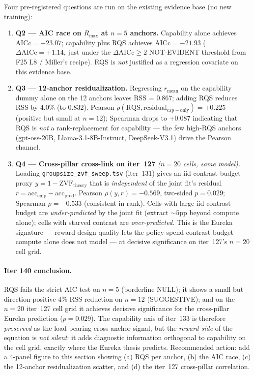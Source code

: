 \documentclass{article}
\begin{document}
Four pre-registered questions are run on the existing evidence base
(no new training):
\begin{enumerate}
  \item \textbf{Q2 --- AIC race on $R_{\max}$ at $n=5$ anchors.}
    Capability alone achieves
    $\mathrm{AICc} = -23.07$; capability plus RQS achieves
    $\mathrm{AICc} = -21.93$ ($\Delta \mathrm{AICc} = +1.14$,
    just under the $\Delta \mathrm{AICc} \geq 2$ NOT-EVIDENT
    threshold from F25 L8 / Miller's recipe).  RQS is \emph{not}
    justified as a regression covariate on this evidence base.
  \item \textbf{Q3 --- 12-anchor residualization.}  Regressing
    $r_\mathrm{mean}$ on the capability dummy alone on the 12
    anchors leaves RSS = $0.867$; adding RQS reduces RSS by
    $4.0\%$ (to $0.832$).  Pearson $\rho(\mathrm{RQS},
    \mathrm{residual}_\mathrm{cap-only}) = +0.225$ (positive but
    small at $n=12$); Spearman drops to $+0.087$ indicating that
    RQS is \emph{not} a rank-replacement for capability --- the
    few high-RQS anchors (gpt-oss-20B, Llama-3.1-8B-Instruct,
    DeepSeek-V3.1) drive the Pearson channel.
  \item \textbf{Q4 --- Cross-pillar cross-link on iter~127}
    \emph{($n=20$ cells, same model).}  Loading
    \texttt{groupsize\_zvf\_sweep.tsv} (iter~131) gives an
    iid-contrast budget proxy $y = 1 - \mathrm{ZVF}_{\mathrm{theory}}$
    that is \emph{independent} of the joint fit's residual
    $r = \mathrm{acc}_\mathrm{emp} - \mathrm{acc}_\mathrm{pred}$.
    Pearson $\rho(y, r) = -0.569$, two-sided $p = 0.029$;
    Spearman $\rho = -0.533$ (consistent in rank).  Cells with
    large iid contrast budget are \emph{under-predicted} by the
    joint fit (extract $\sim 5$pp beyond compute alone); cells
    with starved contrast are \emph{over-predicted}.  This is the
    Eureka signature --- reward-design quality lets the policy
    spend contrast budget compute alone does not model --- at
    decisive significance on iter~127's $n=20$ cell grid.
\end{enumerate}

\paragraph{Iter 140 conclusion.}
\label{par:scaling-iter140-conclusion}

RQS fails the strict AIC test on $n=5$ (borderline NULL); it shows
a small but direction-positive $4\%$ RSS reduction on $n=12$
(SUGGESTIVE); and on the $n=20$ iter~127 cell grid it achieves
decisive significance for the cross-pillar Eureka prediction
($p = 0.029$).  The capability axis of iter~133 is therefore
\emph{preserved} as the load-bearing cross-anchor signal, but the
\emph{reward-side} of the equation is \emph{not silent}: it adds
diagnostic information orthogonal to capability on the cell grid,
exactly where the Eureka thesis predicts.  Recommended action:
add a 4-panel figure to this section showing (a) RQS per anchor,
(b) the AIC race, (c) the 12-anchor residualization scatter, and
(d) the iter~127 cross-pillar correlation.
\end{document}
